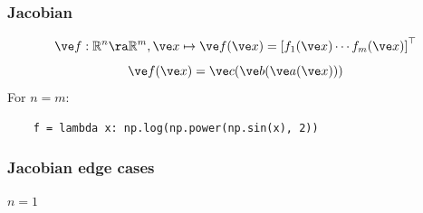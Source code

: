 \documentclass[fleqn,10pt]{beamer}
\begin{document}
\begin{frame}[fragile]
    \frametitle{Jacobian}
    \begin{equation*}
        \ve f: \mathbb R^n \ra \mathbb R^m, \ve x\mapsto \ve f(\ve x) = \left[f_1(\ve x) \cdots f_m(\ve x)\right]^\top
    \end{equation*}
    \begin{equation*}
        \ve f(\ve x) = \ve c(\ve b(\ve a(\ve x)))
    \end{equation*}
    For $n=m$:
    \begin{verbatim}
    f = lambda x: np.log(np.power(np.sin(x), 2))
    \end{verbatim}
    \vfill
\end{frame}

\begin{frame}
    \frametitle{Jacobian edge cases}
    $n=1$
    \edgecol
\end{frame}
\end{document}
